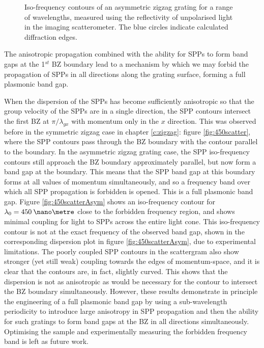 \begin{figure}
	\caption[Iso-frequency contours of an asymmetric zigzag grating for a range of wavelengths.]{Iso-frequency contours of an asymmetric zigzag grating for a range of wavelengths, measured using the reflectivity of unpolarised light in the imaging scatterometer. The blue circles indicate calculated diffraction edges.\label{fig:asymscattergramsALL}}
\end{figure}

The anisotropic propagation combined with the ability for SPPs to form band gaps at the 1$^{st}$ BZ boundary lead to a mechanism by which we may forbid the propagation of SPPs in all directions along the grating surface, forming a full plasmonic band gap.

When the dispersion of the SPPs has become sufficiently anisotropic so that the group velocity of the SPPs are in a single direction, the SPP contours intersect the first BZ at $\pi/\lambda_{gx}$ with momentum only in the $x$ direction. This was observed before in the symmetric zigzag case in chapter \ref{c:zigzag}: figure \ref{fig:450scatter}, where the SPP contours pass through the BZ boundary with the contour parallel to the boundary. In the asymmetric zigzag grating case, the SPP iso-frequency  contours still approach the BZ boundary approximately parallel, but now form a band gap at the boundary. This means that the SPP band gap at this boundary forms at all values of momentum simultaneously,  and so a frequency band over which all SPP propagation is forbidden is opened. This is a full plasmonic band gap. Figure \ref{fig:450scatterAsym} shows an iso-frequency contour for $\lambda_0=450\:\nano\metre$ close to the forbidden frequency region, and shows minimal coupling for light to SPPs across the entire light cone. This iso-frequency contour is not at the exact frequency of the observed band gap, shown in the corresponding  dispersion plot in figure \ref{fig:450scatterAsym}, due to experimental limitations. The poorly coupled SPP contours in the scattergram also show stronger (yet still weak) coupling towards the edges of momentum-space, and it is clear that the contours are, in fact, slightly curved. This shows that the dispersion is not as anisotropic as would be necessary for the contour to intersect the BZ boundary simultaneously. However, these results demonstrate in principle the engineering of a full plasmonic band gap by using a sub-wavelength periodicity to introduce large anisotropy in SPP propagation and then the ability for such gratings to form band gaps at the BZ in all directions simultaneously. Optimising the sample and experimentally measuring the forbidden frequency band is left as future work.

